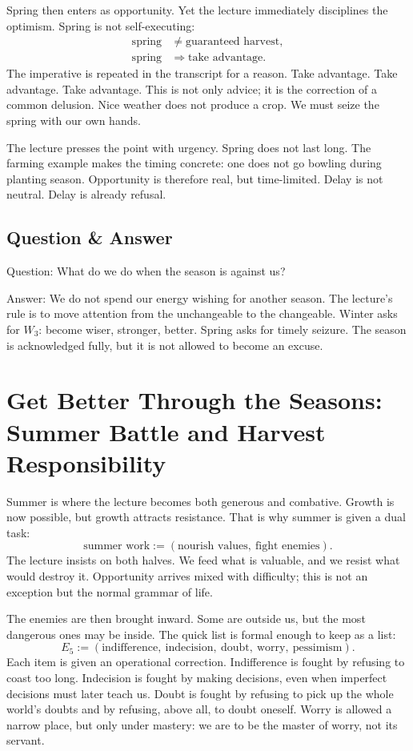 Spring then enters as opportunity. Yet the lecture immediately disciplines the optimism. Spring is not self-executing:
\begin{align}
\text{spring} &\neq \text{guaranteed harvest},\\
\text{spring} &\Rightarrow \text{take advantage}.
\end{align}
The imperative is repeated in the transcript for a reason. Take advantage. Take advantage. Take advantage. This is not only advice; it is the correction of a common delusion. Nice weather does not produce a crop. We must seize the spring with our own hands.

The lecture presses the point with urgency. Spring does not last long. The farming example makes the timing concrete: one does not go bowling during planting season. Opportunity is therefore real, but time-limited. Delay is not neutral. Delay is already refusal.

\subsection{Question \& Answer}

Question: What do we do when the season is against us?

Answer: We do not spend our energy wishing for another season. The lecture's rule is to move attention from the unchangeable to the changeable. Winter asks for \(W_3\): become wiser, stronger, better. Spring asks for timely seizure. The season is acknowledged fully, but it is not allowed to become an excuse.

\section{Get Better Through the Seasons: Summer Battle and Harvest Responsibility}

Summer is where the lecture becomes both generous and combative. Growth is now possible, but growth attracts resistance. That is why summer is given a dual task:
\begin{equation}
\text{summer work} := (\text{nourish values},\ \text{fight enemies}).
\end{equation}
The lecture insists on both halves. We feed what is valuable, and we resist what would destroy it. Opportunity arrives mixed with difficulty; this is not an exception but the normal grammar of life.

The enemies are then brought inward. Some are outside us, but the most dangerous ones may be inside. The quick list is formal enough to keep as a list:
\begin{equation}
E_5 := (\text{indifference},\ \text{indecision},\ \text{doubt},\ \text{worry},\ \text{pessimism}).
\end{equation}
Each item is given an operational correction. Indifference is fought by refusing to coast too long. Indecision is fought by making decisions, even when imperfect decisions must later teach us. Doubt is fought by refusing to pick up the whole world's doubts and by refusing, above all, to doubt oneself. Worry is allowed a narrow place, but only under mastery: we are to be the master of worry, not its servant.

